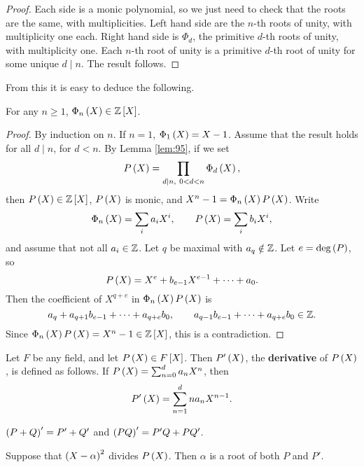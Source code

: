 \begin{proof}
Each side is a monic polynomial, so we just need to check that the roots are the same, with multiplicities. Left hand side are the $ n $-th roots of unity, with multiplicity one each. Right hand side is $ \Phi_d $, the primitive $ d $-th roots of unity, with multiplicity one. Each $ n $-th root of unity is a primitive $ d $-th root of unity for some unique $ d \mid n $. The result follows.
\end{proof}

\pagebreak

From this it is easy to deduce the following.

\begin{lemma}
For any $ n \ge 1 $, $ \Phi_n\br{X} \in \Z\sbr{X} $.
\end{lemma}

\begin{proof}
By induction on $ n $. If $ n = 1 $, $ \Phi_1\br{X} = X - 1 $. Assume that the result holds for all $ d \mid n $, for $ d < n $. By Lemma \ref{lem:95}, if we set
$$ P\br{X} = \prod_{d \mid n, \ 0 < d < n} \Phi_d\br{X}, $$
then $ P\br{X} \in \Z\sbr{X} $, $ P\br{X} $ is monic, and $ X^n - 1 = \Phi_n\br{X}P\br{X} $. Write
$$ \Phi_n\br{X} = \sum_i a_iX^i, \qquad P\br{X} = \sum_i b_iX^i, $$
and assume that not all $ a_i \in \mathbb{Z} $. Let $ q $ be maximal with $ a_q \notin \mathbb{Z} $. Let $ e = \deg\br{P} $, so
$$ P\br{X} = X^e + b_{e - 1}X^{e - 1} + \dots + a_0. $$
Then the coefficient of $ X^{q + e} $ in $ \Phi_n\br{X}P\br{X} $ is
$$ a_q + a_{q + 1}b_{e - 1} + \dots + a_{q + e}b_0, \qquad a_{q - 1}b_{e - 1} + \dots + a_{q + e}b_0 \in \mathbb{Z}. $$
Since $ \Phi_n\br{X}P\br{X} = X^n - 1 \in \Z\sbr{X} $, this is a contradiction.
\end{proof}

\begin{definition}
Let $ F $ be any field, and let $ P\br{X} \in F\sbr{X} $. Then $ P'\br{X} $, the \textbf{derivative} of $ P\br{X} $, is defined as follows. If $ P\br{X} = \sum_{n = 0}^d a_nX^n $, then
$$ P'\br{X} = \sum_{n = 1}^d na_nX^{n - 1}. $$
\end{definition}

\begin{note*}
$ \br{P + Q}' = P' + Q' $ and $ \br{PQ}' = P'Q + PQ' $.
\end{note*}

\begin{lemma}
\label{lem:98}
Suppose that $ \br{X - \alpha}^2 $ divides $ P\br{X} $. Then $ \alpha $ is a root of both $ P $ and $ P' $.
\end{lemma}

